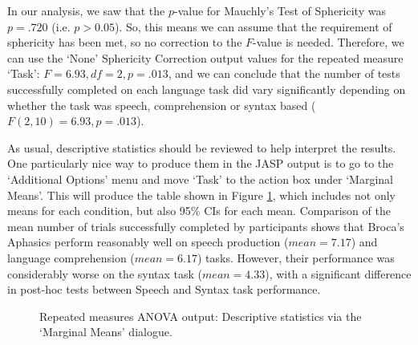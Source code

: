 In our analysis, we saw that the $p$-value for Mauchly’s Test of Sphericity was $p=.720$ (i.e. $p>0.05$). So, this means we can assume that the requirement of sphericity has been met, so no correction to the $F$-value is needed. Therefore, we can use the ‘None’ Sphericity Correction output values for the repeated measure ‘Task’: $F=6.93, df=2, p=.013$, and we can conclude that the number of tests successfully completed on each language task did vary significantly depending on whether the task was speech, comprehension or syntax based ($F(2,10) = 6.93, p=.013$).

\begin{comment}
\begin{figure}[!ht]
\begin{center}
\epsfig{file = ../img/anova/RManova4.png, clip=true,width = 14cm}
\caption{Post-hoc tests in repeated measures ANOVA in JASP}
\HR
\label{fig:RManova4}
\end{center}
\end{figure}

Post-hoc tests can also be specified in JASP for repeated measures ANOVA in the same way as for independent ANOVA. The results are shown in Figure \ref{fig:RManova4}. These indicate that there is a significant difference between Speech and Syntax, but not between other levels.
\end{comment}

As usual, descriptive statistics should be reviewed to help interpret the results. One particularly nice way to produce them in the JASP output is to go to the `Additional Options' menu and move `Task' to the action box under `Marginal Means'. This will produce the table shown in Figure \ref{fig:RManova5}, which includes not only means for each condition, but also 95\% CIs for each mean. Comparison of the mean number of trials successfully completed by participants shows that Broca’s Aphasics perform reasonably well on speech production ($mean=7.17$) and language comprehension ($mean=6.17$) tasks. However, their performance was considerably worse on the syntax task ($mean=4.33$), with a significant difference in post-hoc tests between Speech and Syntax task performance. 

\begin{figure}[!ht]
\begin{center}
\caption{Repeated measures ANOVA output: Descriptive statistics via the `Marginal Means' dialogue.}
\HR
\label{fig:RManova5}
\end{center}
\end{figure}


